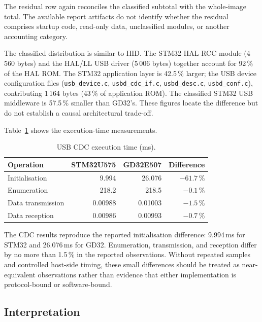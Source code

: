 The residual row again reconciles the classified subtotal with the whole-image total. The
available report artifacts do not identify whether the residual comprises startup code,
read-only data, unclassified modules, or another accounting category.

The classified distribution is similar to HID. The STM32 HAL RCC module (4\,560 bytes) and the
HAL/LL USB driver (5\,006 bytes) together account for 92\,\% of the HAL ROM.
The STM32 application layer is 42.5\,\% larger; the USB device configuration files
(\texttt{usb\_device.c}, \texttt{usbd\_cdc\_if.c},
\texttt{usbd\_desc.c}, \texttt{usbd\_conf.c}), contributing 1\,164 bytes (43\,\% of
application ROM). The classified STM32 USB middleware is 57.5\,\% smaller than GD32's.
These figures locate the difference but do not establish a causal architectural trade-off.

Table~\ref{tab:gd32-usb-cdc-exec} shows the execution-time measurements.

\begin{table}[H]
  \centering
  \caption{USB CDC execution time (ms).}
  \label{tab:gd32-usb-cdc-exec}
  \begin{tabular}{l r r r}
    \toprule
    \textbf{Operation} & \textbf{STM32U575} & \textbf{GD32E507} & \textbf{Difference} \\
    \midrule
    Initialisation      & 9.994   & 26.076 & $-61.7\,\%$ \\
    Enumeration         & 218.2   & 218.5  & $-0.1\,\%$ \\
    Data transmission   & 0.00988 & 0.01003 & $-1.5\,\%$ \\
    Data reception      & 0.00986 & 0.00993 & $-0.7\,\%$ \\
    \bottomrule
  \end{tabular}
\end{table}

The CDC results reproduce the reported initialisation difference: 9.994\,ms for STM32 and
26.076\,ms for GD32. Enumeration, transmission, and reception differ by no more than
1.5\,\% in the reported observations. Without repeated samples and controlled host-side
timing, these small differences should be treated as near-equivalent observations rather
than evidence that either implementation is protocol-bound or software-bound.

\subsection{Interpretation}
\label{sec:gd32-usb-interp}


